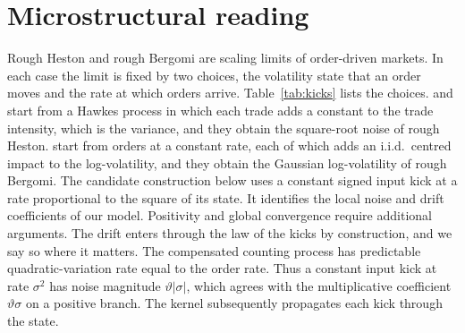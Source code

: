 \section{Microstructural reading}\label{sec:micro}

Rough Heston and rough Bergomi are scaling limits of order-driven markets. In each case the limit is fixed by two choices, the volatility state that an order moves and the rate at which orders arrive. Table~\ref{tab:kicks} lists the choices. \citet{JaissonRosenbaum2016} and \citet{ElEuchFukasawaRosenbaum2018} start from a Hawkes process in which each trade adds a constant to the trade intensity, which is the variance, and they obtain the square-root noise of rough Heston. \citet{HagerHorstWagenhoferXu2026} start from orders at a constant rate, each of which adds an i.i.d.\ centred impact to the log-volatility, and they obtain the Gaussian log-volatility of rough Bergomi. The candidate construction below uses a constant signed input kick at a rate proportional to the square of its state. It identifies the local noise and drift coefficients of our model. Positivity and global convergence require additional arguments. The drift enters through the law of the kicks by construction, and we say so where it matters. The compensated counting process has predictable quadratic-variation rate equal to the order rate. Thus a constant input kick at rate $\sigma^2$ has noise magnitude $\vartheta|\sigma|$, which agrees with the multiplicative coefficient $\vartheta\sigma$ on a positive branch. The kernel subsequently propagates each kick through the state.

\begin{table}
\label{tab:kicks}
\end{table}

